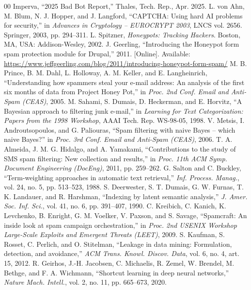 \documentclass[conference]{IEEEtran}
\begin{document}
\begin{thebibliography}{00}
 Imperva, ``2025 Bad Bot Report,'' Thales, Tech. Rep., Apr. 2025.
 L. von Ahn, M. Blum, N. J. Hopper, and J. Langford, ``CAPTCHA: Using hard AI problems for security,'' in \emph{Advances in Cryptology -- EUROCRYPT 2003}, LNCS vol. 2656. Springer, 2003, pp. 294--311.
 L. Spitzner, \emph{Honeypots: Tracking Hackers}. Boston, MA, USA: Addison-Wesley, 2002.
 J. Geerling, ``Introducing the Honeypot form spam protection module for Drupal,'' 2011. [Online]. Available: \url{https://www.jeffgeerling.com/blog/2011/introducing-honeypot-form-spam/}
 M. B. Prince, B. M. Dahl, L. Holloway, A. M. Keller, and E. Langheinrich, ``Understanding how spammers steal your e-mail address: An analysis of the first six months of data from Project Honey Pot,'' in \emph{Proc. 2nd Conf. Email and Anti-Spam (CEAS)}, 2005.
 M. Sahami, S. Dumais, D. Heckerman, and E. Horvitz, ``A Bayesian approach to filtering junk e-mail,'' in \emph{Learning for Text Categorization: Papers from the 1998 Workshop}, AAAI Tech. Rep. WS-98-05, 1998.
 V. Metsis, I. Androutsopoulos, and G. Paliouras, ``Spam filtering with naive Bayes -- which naive Bayes?'' in \emph{Proc. 3rd Conf. Email and Anti-Spam (CEAS)}, 2006.
 T. A. Almeida, J. M. G. Hidalgo, and A. Yamakami, ``Contributions to the study of SMS spam filtering: New collection and results,'' in \emph{Proc. 11th ACM Symp. Document Engineering (DocEng)}, 2011, pp. 259--262.
 G. Salton and C. Buckley, ``Term-weighting approaches in automatic text retrieval,'' \emph{Inf. Process. Manag.}, vol. 24, no. 5, pp. 513--523, 1988.
 S. Deerwester, S. T. Dumais, G. W. Furnas, T. K. Landauer, and R. Harshman, ``Indexing by latent semantic analysis,'' \emph{J. Amer. Soc. Inf. Sci.}, vol. 41, no. 6, pp. 391--407, 1990.
 C. Kreibich, C. Kanich, K. Levchenko, B. Enright, G. M. Voelker, V. Paxson, and S. Savage, ``Spamcraft: An inside look at spam campaign orchestration,'' in \emph{Proc. 2nd USENIX Workshop Large-Scale Exploits and Emergent Threats (LEET)}, 2009.
 S. Kaufman, S. Rosset, C. Perlich, and O. Stitelman, ``Leakage in data mining: Formulation, detection, and avoidance,'' \emph{ACM Trans. Knowl. Discov. Data}, vol. 6, no. 4, art. 15, 2012.
 R. Geirhos, J.-H. Jacobsen, C. Michaelis, R. Zemel, W. Brendel, M. Bethge, and F. A. Wichmann, ``Shortcut learning in deep neural networks,'' \emph{Nature Mach. Intell.}, vol. 2, no. 11, pp. 665--673, 2020.

\end{thebibliography}
\end{document}
